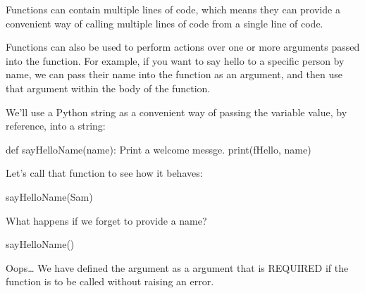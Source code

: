 \documentclass[letterpaper,10pt,english]{sphinxmanual}
\begin{document}
{Functions can contain multiple lines of code, which means they can provide a convenient way of calling multiple lines of code from a single line of code.

Functions can also be used to perform actions over one or more arguments passed into the function. For example, if you want to say hello to a specific person by name, we can pass their name into the function as an argument, and then use that argument within the body of the function.

We’ll use a Python \sphinxhyphen{}string as a convenient way of passing the variable value, by reference, into a string:

{
\begin{sphinxVerbatim}[commandchars=\\\{\}]
\llap{\color{nbsphinxin}[ ]:\,\hspace{\fboxrule}\hspace{\fboxsep}}def sayHelloName(name):
    \PYGZdq{}\PYGZdq{}\PYGZdq{}Print a welcome messge.\PYGZdq{}\PYGZdq{}\PYGZdq{}
    print(f\PYGZdq{}Hello, \PYGZob{}name\PYGZcb{}\PYGZdq{})
\end{sphinxVerbatim}
}

Let’s call that function to see how it behaves:

{
\begin{sphinxVerbatim}[commandchars=\\\{\}]
\llap{\color{nbsphinxin}[ ]:\,\hspace{\fboxrule}\hspace{\fboxsep}}sayHelloName(\PYGZdq{}Sam\PYGZdq{})
\end{sphinxVerbatim}
}

What happens if we forget to provide a name?

{
\begin{sphinxVerbatim}[commandchars=\\\{\}]
\llap{\color{nbsphinxin}[ ]:\,\hspace{\fboxrule}\hspace{\fboxsep}}sayHelloName()
\end{sphinxVerbatim}
}

Oops… We have defined the argument as a  argument that is REQUIRED if the function is to be called without raising an error.

}
\end{document}
